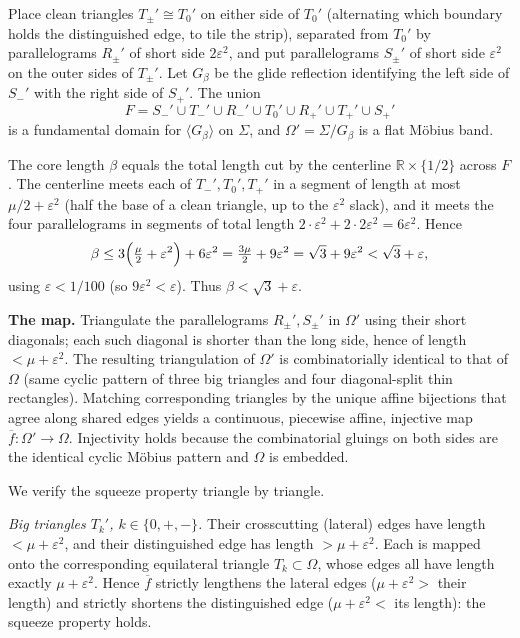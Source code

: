 Place clean triangles $T_\pm'\cong T_0'$ on either side of $T_0'$ (alternating which
boundary holds the distinguished edge, to tile the strip), separated from $T_0'$ by
parallelograms $R_\pm'$ of short side $2\varepsilon^2$, and put parallelograms
$S_\pm'$ of short side $\varepsilon^2$ on the outer sides of $T_\pm'$. Let $G_\beta$
be the glide reflection identifying the left side of $S_-'$ with the right side of
$S_+'$. The union
\[
F=S_-'\cup T_-'\cup R_-'\cup T_0'\cup R_+'\cup T_+'\cup S_+'
\]
is a fundamental domain for $\langle G_\beta\rangle$ on $\Sigma$, and
$\Omega'=\Sigma/G_\beta$ is a flat Möbius band.

The core length $\beta$ equals the total length cut by the centerline
$\mathbb{R}\times\{1/2\}$ across $F$. The centerline meets each of $T_-',T_0',T_+'$
in a segment of length at most $\mu/2+\varepsilon^2$ (half the base of a clean
triangle, up to the $\varepsilon^2$ slack), and it meets the four parallelograms in
segments of total length $2\cdot\varepsilon^2+2\cdot 2\varepsilon^2=6\varepsilon^2$.
Hence
\[
\beta\le 3\Bigl(\tfrac{\mu}{2}+\varepsilon^2\Bigr)+6\varepsilon^2
=\tfrac{3\mu}{2}+9\varepsilon^2=\sqrt3+9\varepsilon^2<\sqrt3+\varepsilon,
\]
using $\varepsilon<1/100$ (so $9\varepsilon^2<\varepsilon$). Thus
$\beta<\sqrt3+\varepsilon$.

\medskip
\noindent\textbf{The map.}
Triangulate the parallelograms $R_\pm',S_\pm'$ in $\Omega'$ using their short
diagonals; each such diagonal is shorter than the long side, hence of length
$<\mu+\varepsilon^2$. The resulting triangulation of $\Omega'$ is combinatorially
identical to that of $\Omega$ (same cyclic pattern of three big triangles and four
diagonal-split thin rectangles). Matching corresponding triangles by the unique
affine bijections that agree along shared edges yields a continuous, piecewise
affine, injective map $\overline f\colon\Omega'\to\Omega$. Injectivity holds because
the combinatorial gluings on both sides are the identical cyclic Möbius pattern and
$\Omega$ is embedded.

We verify the squeeze property triangle by triangle.

\emph{Big triangles $T_k'$, $k\in\{0,+,-\}$.} Their crosscutting (lateral) edges
have length $<\mu+\varepsilon^2$, and their distinguished edge has length
$>\mu+\varepsilon^2$. Each is mapped onto the corresponding equilateral triangle
$T_k\subset\Omega$, whose edges all have length exactly $\mu+\varepsilon^2$. Hence
$\overline f$ strictly lengthens the lateral edges
($\mu+\varepsilon^2>$ their length) and strictly shortens the distinguished edge
($\mu+\varepsilon^2<$ its length): the squeeze property holds.

